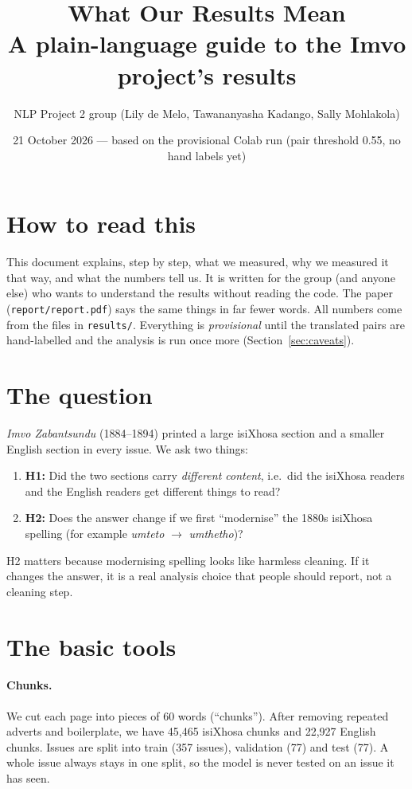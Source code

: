 \documentclass[11pt,a4paper]{article}
\title{What Our Results Mean\\[4pt] \large A plain-language guide to the Imvo project's results}
\author{NLP Project 2 group (Lily de Melo, Tawananyasha Kadango, Sally Mohlakola)}
\date{21 October 2026 --- based on the provisional Colab run (pair threshold 0.55, no hand labels yet)}
\begin{document}
\maketitle

\section*{How to read this}
This document explains, step by step, what we measured, why we measured it that way, and what the
numbers tell us. It is written for the group (and anyone else) who wants to understand the results
without reading the code. The paper (\texttt{report/report.pdf}) says the same things in far fewer
words. All numbers come from the files in \texttt{results/}. Everything is \emph{provisional} until the
translated pairs are hand-labelled and the analysis is run once more (Section~\ref{sec:caveats}).

\section{The question}
\emph{Imvo Zabantsundu} (1884--1894) printed a large isiXhosa section and a smaller English section in
every issue. We ask two things:
\begin{enumerate}
  \item \textbf{H1:} Did the two sections carry \emph{different content}, i.e.\ did the isiXhosa readers
  and the English readers get different things to read?
  \item \textbf{H2:} Does the answer change if we first ``modernise'' the 1880s isiXhosa spelling
  (for example \emph{umteto} $\to$ \emph{umthetho})?
\end{enumerate}
H2 matters because modernising spelling looks like harmless cleaning. If it changes the answer, it is a
real analysis choice that people should report, not a cleaning step.

\section{The basic tools}

\paragraph{Chunks.} We cut each page into pieces of 60 words (``chunks''). After removing repeated
adverts and boilerplate, we have 45{,}465 isiXhosa chunks and 22{,}927 English chunks. Issues are split
into train (357 issues), validation (77) and test (77). A whole issue always stays in one split, so the
model is never tested on an issue it has seen.
\end{document}
